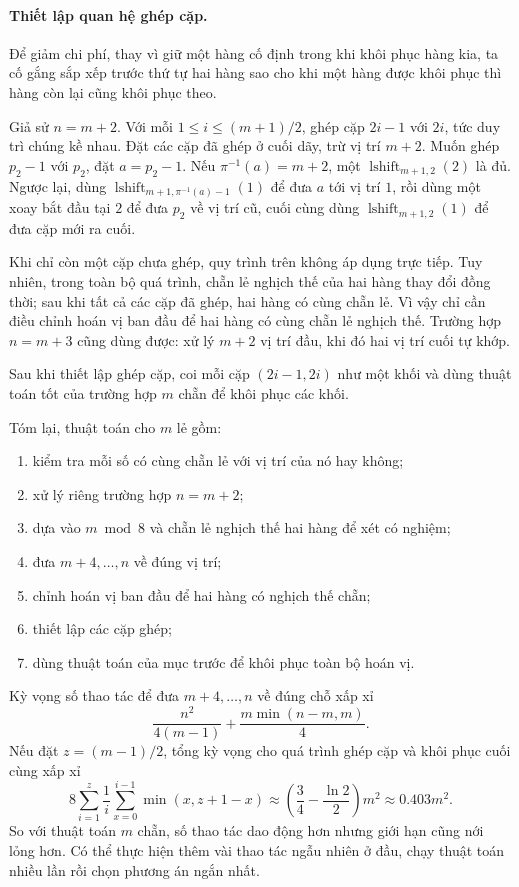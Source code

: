 \documentclass[11pt]{article}
\begin{document}
\paragraph{Thiết lập quan hệ ghép cặp.}
Để giảm chi phí, thay vì giữ một hàng cố định trong khi khôi phục hàng kia, ta
cố gắng sắp xếp trước thứ tự hai hàng sao cho khi một hàng được khôi phục thì
hàng còn lại cũng khôi phục theo.

Giả sử $n=m+2$. Với mỗi $1\le i\le (m+1)/2$, ghép cặp $2i-1$ với $2i$, tức duy
trì chúng kề nhau. Đặt các cặp đã ghép ở cuối dãy, trừ vị trí $m+2$. Muốn ghép
$p_2-1$ với $p_2$, đặt $a=p_2-1$. Nếu $\pi^{-1}(a)=m+2$, một
$\operatorname{lshift}_{m+1,2}(2)$ là đủ. Ngược lại, dùng
$\operatorname{lshift}_{m+1,\pi^{-1}(a)-1}(1)$ để đưa $a$ tới vị trí $1$, rồi
dùng một xoay bắt đầu tại $2$ để đưa $p_2$ về vị trí cũ, cuối cùng dùng
$\operatorname{lshift}_{m+1,2}(1)$ để đưa cặp mới ra cuối.

Khi chỉ còn một cặp chưa ghép, quy trình trên không áp dụng trực tiếp. Tuy
nhiên, trong toàn bộ quá trình, chẵn lẻ nghịch thế của hai hàng thay đổi đồng
thời; sau khi tất cả các cặp đã ghép, hai hàng có cùng chẵn lẻ. Vì vậy chỉ cần
điều chỉnh hoán vị ban đầu để hai hàng có cùng chẵn lẻ nghịch thế. Trường hợp
$n=m+3$ cũng dùng được: xử lý $m+2$ vị trí đầu, khi đó hai vị trí cuối tự khớp.

Sau khi thiết lập ghép cặp, coi mỗi cặp $(2i-1,2i)$ như một khối và dùng thuật
toán tốt của trường hợp $m$ chẵn để khôi phục các khối.

Tóm lại, thuật toán cho $m$ lẻ gồm:
\begin{enumerate}
  \item kiểm tra mỗi số có cùng chẵn lẻ với vị trí của nó hay không;
  \item xử lý riêng trường hợp $n=m+2$;
  \item dựa vào $m\bmod 8$ và chẵn lẻ nghịch thế hai hàng để xét có nghiệm;
  \item đưa $m+4,\ldots,n$ về đúng vị trí;
  \item chỉnh hoán vị ban đầu để hai hàng có nghịch thế chẵn;
  \item thiết lập các cặp ghép;
  \item dùng thuật toán của mục trước để khôi phục toàn bộ hoán vị.
\end{enumerate}
Kỳ vọng số thao tác để đưa $m+4,\ldots,n$ về đúng chỗ xấp xỉ
\[
  \frac{n^2}{4(m-1)}+\frac{m\min(n-m,m)}4.
\]
Nếu đặt $z=(m-1)/2$, tổng kỳ vọng cho quá trình ghép cặp và khôi phục cuối cùng
xấp xỉ
\[
  8\sum_{i=1}^z \frac1i\sum_{x=0}^{i-1}\min(x,z+1-x)
  \approx \left(\frac34-\frac{\ln 2}{2}\right)m^2
  \approx 0.403m^2.
\]
So với thuật toán $m$ chẵn, số thao tác dao động hơn nhưng giới hạn cũng nới
lỏng hơn. Có thể thực hiện thêm vài thao tác ngẫu nhiên ở đầu, chạy thuật toán
nhiều lần rồi chọn phương án ngắn nhất.
\end{document}
